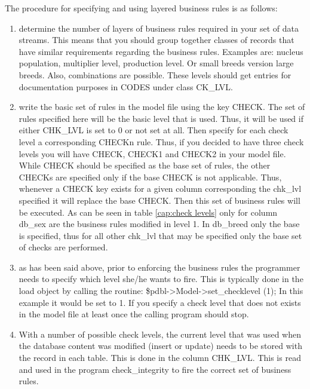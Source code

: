 The procedure for specifying and using layered business rules is as
follows:

\begin{enumerate}
\item determine the number of layers of business rules required in your
set of data streams. This means that you should group together classes
of records that have similar requirements regarding the business rules.
Examples are: nucleus population, multiplier level, production level.
Or small breeds version large breeds. Also, combinations are possible.
These levels should get entries for documentation purposes in CODES
under class CK\_LVL.
\item write the basic set of rules in the model file using the key CHECK.
The set of rules specified here will be the basic level that is used.
Thus, it will be used if either CHK\_LVL is set to 0 or not set at
all. Then specify for each check level a corresponding CHECKn rule.
Thus, if you decided to have three check levels you will have CHECK,
CHECK1 and CHECK2 in your model file. While CHECK should be specified
as the base set of rules, the other CHECKs are specified only if the
base CHECK is not applicable. Thus, whenever a CHECK key exists for
a given column corresponding the chk\_lvl specified it will replace
the base CHECK. Then this set of business rules will be executed.
As can be seen in table \ref{cap:check levels} only for column db\_sex
are the business rules modified in level 1. In db\_breed only the
base is specified, thus for all other chk\_lvl that may be specified
only the base set of checks are performed.
\item as has been said above, prior to enforcing the business rules the
programmer needs to specify which level she/he wants to fire. This
is typically done in the load object by calling the routine: \$pdbl->Model->set\_checklevel
(1); In this example it would be set to 1. If you specify a check
level that does not exists in the model file at least once the calling
program should stop.
\item With a number of possible check levels, the current level that was
used when the database content was modified (insert or update) needs
to be stored with the record in each table. This is done in the column
CHK\_LVL. This is read and used in the program check\_integrity
to fire the correct set of business rules.
\end{enumerate}
%
